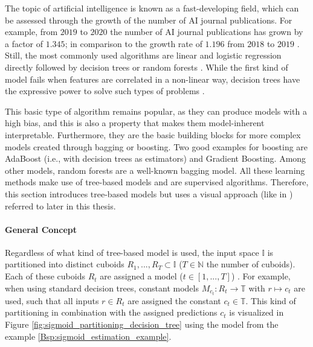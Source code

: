     The topic of artificial intelligence is known as a fast-developing field, which can be assessed through the growth of the number of AI journal publications. For example, from $2019$ to $2020$ the number of AI journal publications has grown by a factor of $1.345$; in comparison to the growth rate of $1.196$ from $2018$ to $2019$ \cite{zhang2021ai}. Still, the most commonly used algorithms are linear and logistic regression directly followed by decision trees or random forests \cite{state_of_data_science_2021}. While the first kind of model fails when features are correlated in a non-linear way, decision trees have the expressive power to solve such types of problems \cite{molnar2020interpretable}. 
    
    This basic type of algorithm remains popular, as they can produce models with a high bias, and this is also a property that makes them model-inherent interpretable. Furthermore, they are the basic building blocks for more complex models created through bagging or boosting. Two good examples for boosting are AdaBoost (i.e., with decision trees as estimators) and Gradient Boosting. Among other models, random forests are a well-known bagging model. All these learning methods make use of tree-based models and are supervised algorithms. Therefore, this section introduces tree-based models but uses a visual approach (like in \cite{dtreeviz}) referred to later in this thesis. 
    
    \paragraph{General Concept} Regardless of what kind of tree-based model is used, the input space $\mathbb{I}$ is partitioned into distinct cuboids $R_1,...,R_T \subset \mathbb{I}$ ($T \in \mathbb{N}$ the number of cuboids). Each of these cuboids $R_t$ are assigned a model ($t \in [1,...,T]$) \cite{bishop2006pattern}. For example, when using standard decision trees, constant models $M_{c_t}: R_t \to \mathbb{T}$ with $r \mapsto c_t$ are used, such that all inputs $r \in R_t$ are assigned the constant $c_t \in \mathbb{T}$. This kind of partitioning in combination with the assigned predictions $c_t$ is visualized in Figure \ref{fig:sigmoid_partitioning_decision_tree} using the model from the example \ref{Bsp:sigmoid_estimation_example}.
    

